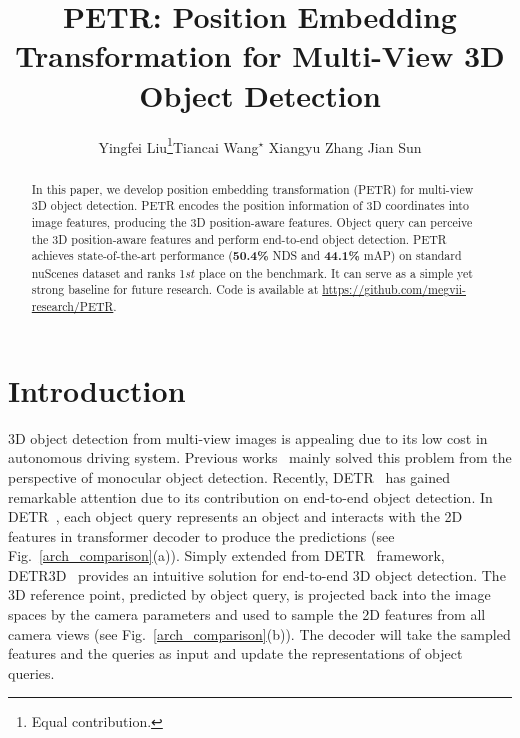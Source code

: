 \documentclass[runningheads]{llncs}
\begin{document}
\pagestyle{headings}
\mainmatter
\def\ECCVSubNumber{4420}  

\title{PETR: Position Embedding Transformation for Multi-View 3D Object Detection} 

\begin{comment}
\titlerunning{ECCV-22 submission ID \ECCVSubNumber} 
\authorrunning{ECCV-22 submission ID \ECCVSubNumber} 
\author{Anonymous ECCV submission}
\institute{Paper ID \ECCVSubNumber}
\end{comment}


\author{Yingfei Liu\thanks{Equal contribution.}\qquad Tiancai Wang$^{\star}$ \qquad Xiangyu Zhang \qquad Jian Sun
}




\maketitle

\begin{abstract}
In this paper, we develop position embedding transformation (PETR) for multi-view 3D object detection. PETR encodes the position information of 3D coordinates into image features, producing the 3D position-aware features. Object query can perceive the 3D position-aware features and perform end-to-end object detection. PETR achieves state-of-the-art performance (\textbf{50.4\%} NDS and \textbf{44.1\%} mAP) on standard nuScenes dataset and ranks 1$st$ place on the benchmark. It can serve as a simple yet strong baseline for future research.
Code is available at \url{https://github.com/megvii-research/PETR}.
\end{abstract}

\section{Introduction}
3D object detection from multi-view images is appealing due to its low cost in autonomous driving system. Previous works~\cite{chen2016monocular,mousavian20173d,wang2021fcos3d,park2021dd3d,wang2022pgd} mainly solved this problem from the perspective of monocular object detection. Recently, DETR~\cite{carion2020detr} has gained remarkable attention due to its contribution on end-to-end object detection. In DETR~\cite{carion2020detr}, each object query represents an object and interacts with the 2D features in transformer decoder to produce the predictions (see Fig.~\ref{arch_comparison}(a)).
Simply extended from DETR~\cite{carion2020detr} framework, DETR3D~\cite{wang2022detr3d} provides an intuitive solution for end-to-end 3D object detection. The 3D reference point, predicted by object query, is projected back into the image spaces by the camera parameters and used to sample the 2D features from all camera views (see Fig.~\ref{arch_comparison}(b)). The decoder will take the sampled features and the queries as input and update the representations of object queries.
\end{document}
